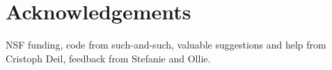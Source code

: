 \section{Acknowledgements}

NSF funding, code from such-and-such, valuable
suggestions and help from Cristoph Deil, feedback
from Stefanie and Ollie. 
